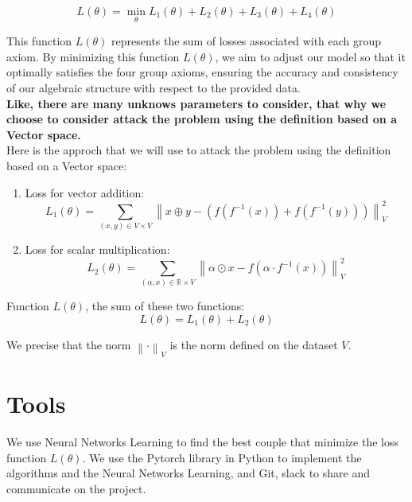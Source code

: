 \documentclass{report}
\begin{document}
    $$
    L(\theta) = \min_{\theta} L_1(\theta) + L_2(\theta) + L_3(\theta) + L_4(\theta)
    $$


    This function $L(\theta)$ represents the sum of losses 
    associated with each group axiom. By minimizing 
    this function $L(\theta)$, we aim to adjust our model so
    that it optimally satisfies the four group axioms, 
    ensuring the accuracy and consistency of our 
    algebraic structure with respect to the provided data.\\

    \textbf{Like, there are many unknows parameters to consider, that why we choose to consider attack the problem using the definition based on a Vector space.}\\

    
    Here is the approch that we will use to attack the problem using the definition based on a Vector space:


    \begin{enumerate}
        \item Loss for vector addition:
        \[
            L_1(\theta) = \sum_{(x, y) \in V \times V} \left\lVert x \oplus y - \left(f(f^{-1}(x)) + f(f^{-1}(y))\right) \right\rVert_{V}^2
        \]
        \item Loss for scalar multiplication:
        \[
            L_2(\theta) = \sum_{(\alpha, x) \in \mathbb{R} \times V} \left\lVert \alpha \odot x - f(\alpha \cdot f^{-1}(x)) \right\rVert_{V}^2
        \]
    \end{enumerate}

    Function $L(\theta)$, the sum of these two functions:
    \[
    L(\theta) = L_1(\theta) + L_2(\theta)
    \]

    We  precise that the norm $\left\lVert \cdot \right\rVert_{V}$ is the norm defined on the dataset $V$.

\section{Tools}
    We use Neural Networks Learning to find the best couple that minimize the loss function $L(\theta)$.
    We use the Pytorch library in Python to implement the algorithms and the Neural Networks Learning, and Git, slack to share and communicate on the project.
\end{document}
